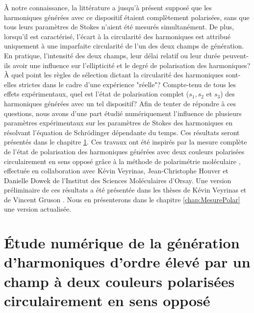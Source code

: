 \`{A} notre connaissance, la littérature a jusqu'à présent supposé que les harmoniques générées avec ce dispositif étaient complètement polarisées, sans que tous leurs paramètres de Stokes n'aient été mesurés simultanément. De plus, lorsqu'il est caractérisé, l'écart à la circularité des harmoniques est attribué uniquement à une imparfaite circularité de l'un des deux champs de génération. En pratique, l'intensité des deux champs, leur délai relatif ou leur durée peuvent-ils avoir une influence sur l'ellipticité et le degré de polarisation des harmoniques? \`{A} quel point les règles de sélection dictant la circularité des harmoniques sont-elles strictes dans le cadre d'une expérience "réelle"? Compte-tenu de tous les effets expérimentaux, quel est l'état de polarisation complet ($s_1, s_2$ et $s_3$) des harmoniques générées avec un tel dispositif? Afin de tenter de répondre à ces questions, nous avons d'une part étudié numériquement l'influence de plusieurs paramètres expérimentaux sur les paramètres de Stokes des harmoniques en résolvant l'équation de Schrödinger dépendante du temps. Ces résultats seront présentés dans le chapitre \ref{chap:calculsTA}. Ces travaux ont été inspirés par la mesure complète de l'état de polarisation des harmoniques générées avec deux couleurs polarisées circulairement en sens opposé grâce à la méthode de polarimétrie moléculaire , effectuée en collaboration avec Kévin Veyrinas, Jean-Christophe Houver et Danielle Dowek de l'Institut des Sciences Moléculaires d'Orsay. Une version préliminaire de ces résultats a été présentée dans les thèses de Kévin Veyrinas  et de Vincent Gruson . Nous en présenterons dans le chapitre \ref{chap:MesurePolar} une version actualisée.

\chapter[Etude numérique de la GHOE par un champ à deux couleurs polarisées circulairement en sens opposé]{\'{E}tude numérique de la génération d'harmoniques d'ordre élevé par un champ à deux couleurs polarisées circulairement en sens opposé}
\label{chap:calculsTA}

